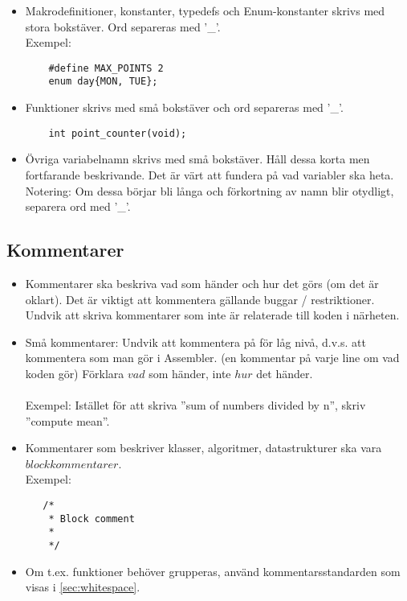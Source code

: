\documentclass[a4paper]{article}
\begin{document}
    \begin{itemize}
    
    \item Makrodefinitioner, konstanter, typedefs och Enum-konstanter skrivs med stora bokstäver. Ord separeras med '\_'.\\
    Exempel:
    \begin{lstlisting}
    #define MAX_POINTS 2
    enum day{MON, TUE};
    \end{lstlisting}
    
    \item Funktioner skrivs med små bokstäver och ord separeras med '\_'. 
    \begin{lstlisting}
    int point_counter(void);
    \end{lstlisting}
    
    \item Övriga variabelnamn skrivs med små bokstäver. Håll dessa korta men fortfarande beskrivande. Det är värt att fundera på vad variabler ska heta.
    Notering:
    Om dessa börjar bli långa och förkortning av namn blir otydligt, separera ord med '\_'.
    
    \end{itemize}
    
\subsection{Kommentarer}

    \begin{itemize}
    
    \item Kommentarer ska beskriva vad som händer och hur det görs (om det är oklart). Det är viktigt att kommentera gällande buggar / restriktioner. Undvik att skriva kommentarer som inte är relaterade till koden i närheten. 
    
    \item Små kommentarer:
    Undvik att kommentera på för låg nivå, d.v.s. att kommentera som man gör i Assembler. (en kommentar på varje line om vad koden gör) Förklara \(vad\) som händer, inte \(hur\) det händer. \\\\
    Exempel: Istället för att skriva ''sum of numbers divided by n'', skriv ''compute mean''.
    
    \item Kommentarer som beskriver klasser, algoritmer, datastrukturer ska vara \(blockkommentarer\).
    \\
    Exempel: 
    \begin{lstlisting}
   /*
    * Block comment
    * 
    */
    \end{lstlisting}
    
    \item Om t.ex. funktioner behöver grupperas, använd kommentarsstandarden som visas i \ref{sec:whitespace}.
    
    \end{itemize}
\end{document}
